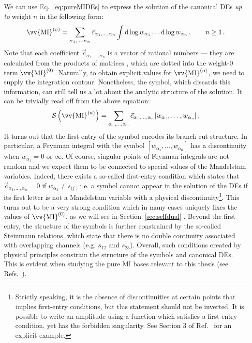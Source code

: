 \documentclass[main.tex]{subfiles}
\begin{document}
We can use Eq.~\ref{eq:pureMIDEs} to express the solution of the canonical DEs \textit{up to} weight $n$ in the following form:
\begin{equation} \label{eq:pureMIDEsupton}
    \vv{\text{MI}}^{(n)} = \sum_{\alpha_1, \ldots, \alpha_n} \vec{c}_{\alpha_1, \ldots, \alpha_n} \int \dd \log w_{\alpha_1} \ldots \dd \log w_{\alpha_n}\,, \qquad n\ge1\,.
\end{equation}
Note that each coefficient $\vec{c}_{\alpha_1, \ldots, \alpha_n}$ is a vector of rational numbers --- they are calculated from the products of matrices , which are dotted into the weight-0 term $\vv{\text{MI}}^{(0)}$. Naturally, to obtain explicit values for $\vv{\text{MI}}^{(n)}$, we need to supply the integration contour. Nonetheless, the symbol, which discards this information, can still tell us a lot about the analytic structure of the solution. It can be trivially read off from the above equation:
\begin{equation}
    \SS\left(\vv{\text{MI}}^{(n)}\right) = \sum_{\alpha_1, \ldots, \alpha_n} \vec{c}_{\alpha_1, \ldots, \alpha_n} [w_{\alpha_1}, \ldots, w_{\alpha_n}]\,.
\end{equation}
It turns out that the first entry of the symbol encodes its branch cut structure. In particular, a Feynman integral with the symbol $[w_{\alpha_1}, \ldots, w_{\alpha_n}]$ has a discontinuity when $w_{\alpha_1}=0$ or $\infty$. Of course, singular points of Feynman integrals are not random and we expect them to be connected to special values of the Mandelstam variables. Indeed, there exists a so-called first-entry condition which states that $\vec{c}_{\alpha_1, \ldots, \alpha_n}=0$ if $w_{\alpha_1} \neq s_{ij}\,$, i.e. a symbol cannot appear in the solution of the DEs if its first letter is not a Mandelstam variable with a physical discontinuity\footnote{Strictly speaking, it is the absence of discontinuities at certain points that implies first-entry conditions, but this statement should not be inverted. It is possible to write an amplitude using a function which satisfies a first-entry condition, yet has the forbidden singularity. See Section 3 of Ref.~\cite{Zoia:2021zmb} for an explicit example.}\cite{Gaiotto:2011dt}. This turns out to be a very strong condition which in many cases uniquely fixes the values of $\vv{\text{MI}}^{(0)}$, as we will see in Section~\ref{sec:selfdual} . Beyond the first entry, the structure of the symbols is further constrained by the so-called Steinmann relations, which state that there is no double continuity associated with overlapping channels (e.g. $s_{12}$ and $s_{23}$)\cite{20.500.11850/135473, Steinmann:1960, Caron-Huot:2016owq, Dixon:2016nkn}. Overall, such conditions created by physical principles constrain the structure of the symbols and canonical DEs. This is evident when studying the pure MI bases relevant to this thesis (see Refs.~\cite{Abreu:2020jxa, abreu2021twoloop}).
\end{document}
